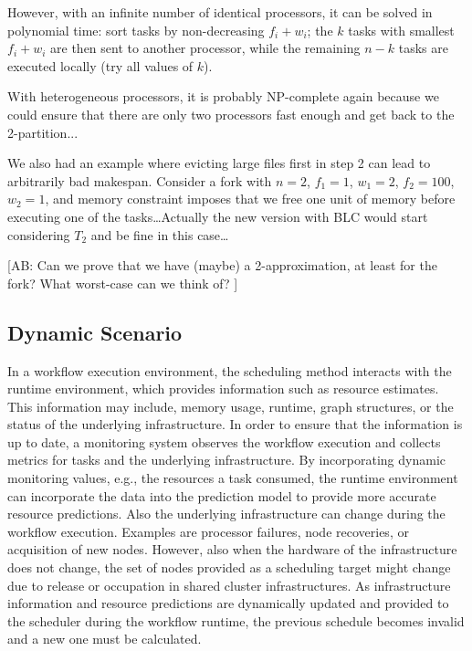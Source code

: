 \documentclass[conference]{IEEEtran}
\newcommand{\AB}[1]{{\color{purple}[AB: #1]}}
\begin{document}
    However, with an infinite number of identical processors, it can be
    solved in polynomial time: sort tasks by non-decreasing $f_i+w_i$;
    the $k$ tasks with smallest $f_i+w_i$ are then sent to another processor,
    while the remaining $n-k$ tasks are executed locally (try all values of $k$).

    With heterogeneous processors, it is probably NP-complete again
    because we could ensure that there are only two processors fast enough
    and get back to the 2-partition...

    We also had an example where evicting large files first in step 2
    can lead to arbitrarily bad makespan. Consider a fork with $n=2$,
    $f_1=1$, $w_1=2$, $f_2=100$, $w_2=1$, and memory constraint
    imposes that we free one unit of memory before executing one
    of the tasks\ldots Actually the new version with BLC would start
    considering $T_2$ and be fine in this case\ldots


    \AB{Can we prove that we have (maybe) a 2-approximation,
        at least for the fork? What worst-case can we think of? }


    \subsection{Dynamic Scenario}

    In a workflow execution environment, the scheduling method interacts with the runtime environment, which provides information such as resource estimates.
    This information may include, memory usage, runtime, graph structures, or the status of the underlying infrastructure.
    In order to ensure that the information is up to date, a monitoring system observes the workflow execution and collects metrics for tasks and the underlying infrastructure.
    By incorporating dynamic monitoring values, e.g., the resources a task consumed, the runtime environment can incorporate the data into the prediction model to provide more accurate resource predictions.
    Also the underlying infrastructure can change during the workflow execution.
    Examples are processor failures, node recoveries, or acquisition of new nodes.
    However, also when the hardware of the infrastructure does not change, the set of nodes provided as a scheduling target might change due to release or occupation in shared cluster infrastructures.
    As infrastructure information and resource predictions are dynamically updated and provided to the scheduler during the workflow runtime, the previous schedule becomes invalid and a new one must be calculated.
\end{document}
